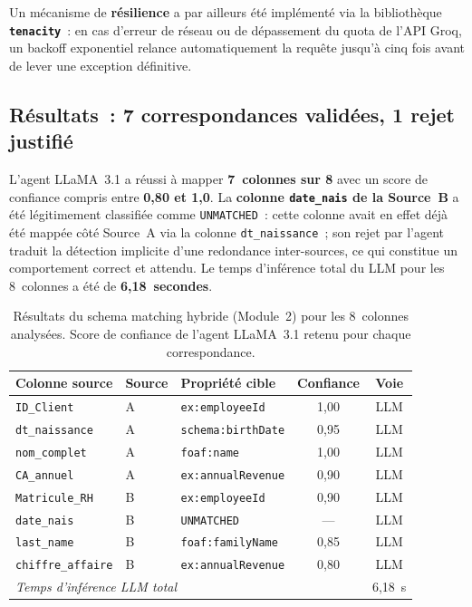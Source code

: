 Un mécanisme de \textbf{résilience} a par ailleurs été implémenté
via la bibliothèque \textbf{\texttt{tenacity}}~: en cas d'erreur de
réseau ou de dépassement du quota de l'API Groq, un backoff
exponentiel relance automatiquement la requête jusqu'à cinq fois avant
de lever une exception définitive.

\subsection{Résultats~: 7 correspondances validées, 1 rejet justifié}
\label{subsec:matching_results}

L'agent LLaMA~3.1 a réussi à mapper \textbf{7~colonnes sur 8} avec
un score de confiance compris entre \textbf{0,80 et 1,0}. La
\textbf{colonne \texttt{date\_nais} de la Source~B} a été
légitimement classifiée comme \texttt{UNMATCHED}~: cette colonne
avait en effet déjà été mappée côté Source~A via la colonne
\texttt{dt\_naissance}~; son rejet par l'agent traduit la détection
implicite d'une redondance inter-sources, ce qui constitue un
comportement correct et attendu. Le temps d'inférence total du
LLM pour les 8~colonnes a été de \textbf{6,18~secondes}.

\begin{table}[h]
\centering
\caption{Résultats du schema matching hybride (Module~2) pour les
         8~colonnes analysées. Score de confiance de l'agent LLaMA~3.1
         retenu pour chaque correspondance.}
\label{tab:res_module2}
\begin{tabular}{p{3.0cm}lp{3.2cm}cc}
\hline
\textbf{Colonne source}
  & \textbf{Source}
  & \textbf{Propriété cible}
  & \textbf{Confiance}
  & \textbf{Voie} \\
\hline
\texttt{ID\_Client}       & A & \texttt{ex:employeeId}     & 1,00 & LLM \\
\texttt{dt\_naissance}    & A & \texttt{schema:birthDate}   & 0,95 & LLM \\
\texttt{nom\_complet}     & A & \texttt{foaf:name}          & 1,00 & LLM \\
\texttt{CA\_annuel}       & A & \texttt{ex:annualRevenue}   & 0,90 & LLM \\
\texttt{Matricule\_RH}    & B & \texttt{ex:employeeId}      & 0,90 & LLM \\
\texttt{date\_nais}       & B & \texttt{UNMATCHED}          & ---  & LLM \\
\texttt{last\_name}       & B & \texttt{foaf:familyName}    & 0,85 & LLM \\
\texttt{chiffre\_affaire} & B & \texttt{ex:annualRevenue}   & 0,80 & LLM \\
\hline
\multicolumn{4}{l}{\textit{Temps d'inférence LLM total}} & 6,18~s \\
\hline
\end{tabular}
\end{table}

